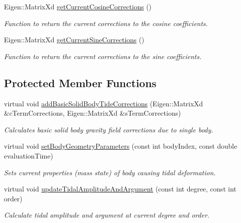 \begin{DoxyCompactItemize}
Eigen\+::\+Matrix\+Xd \hyperlink{classtudat_1_1gravitation_1_1BasicSolidBodyTideGravityFieldVariations_aeb4ea086378d1254b6ece9355401a894}{get\+Current\+Cosine\+Corrections} ()
\begin{DoxyCompactList}\small\item\em Function to return the current corrections to the cosine coefficients. \end{DoxyCompactList}\item 
Eigen\+::\+Matrix\+Xd \hyperlink{classtudat_1_1gravitation_1_1BasicSolidBodyTideGravityFieldVariations_a849347887a7736bf139052146f708727}{get\+Current\+Sine\+Corrections} ()
\begin{DoxyCompactList}\small\item\em Function to return the current corrections to the sine coefficients. \end{DoxyCompactList}\end{DoxyCompactItemize}
\subsection*{Protected Member Functions}
\begin{DoxyCompactItemize}
\item 
virtual void \hyperlink{classtudat_1_1gravitation_1_1BasicSolidBodyTideGravityFieldVariations_aa4a8b7924134fed07f596b6b43df9472}{add\+Basic\+Solid\+Body\+Tide\+Corrections} (Eigen\+::\+Matrix\+Xd \&c\+Term\+Corrections, Eigen\+::\+Matrix\+Xd \&s\+Term\+Corrections)
\begin{DoxyCompactList}\small\item\em Calculates basic solid body gravity field corrections due to single body. \end{DoxyCompactList}\item 
virtual void \hyperlink{classtudat_1_1gravitation_1_1BasicSolidBodyTideGravityFieldVariations_a5026f7ed54fa6d1a60367a0b981913af}{set\+Body\+Geometry\+Parameters} (const int body\+Index, const double evaluation\+Time)
\begin{DoxyCompactList}\small\item\em Sets current properties (mass state) of body causing tidal deformation. \end{DoxyCompactList}\item 
virtual void \hyperlink{classtudat_1_1gravitation_1_1BasicSolidBodyTideGravityFieldVariations_a62c60cf127ad2a396a51b4c0733c7b72}{update\+Tidal\+Amplitude\+And\+Argument} (const int degree, const int order)
\begin{DoxyCompactList}\small\item\em Calculate tidal amplitude and argument at current degree and order. \end{DoxyCompactList}\end{DoxyCompactItemize}
